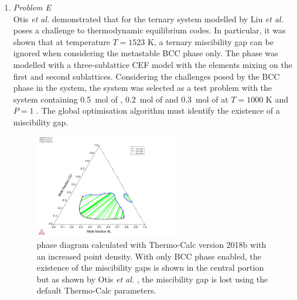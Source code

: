 \begin{enumerate}
	\item	\emph{Problem E}\\
		Otis \textit{et al.} \cite{Otis:2017ab} demonstrated that for the  ternary system modelled by Liu \textit{et al.} \cite{Liu:2015aa} poses a challenge to thermodynamic equilibrium codes. In particular, it was shown that at temperature $T = 1523$  \si{\kelvin}, a ternary miscibility gap can be ignored when considering the metastable BCC phase only. The phase was modelled with a three-sublattice CEF model with the elements mixing on the first and second sublattices. Considering the challenges posed by the BCC phase in the system, the system was selected as a test problem with the system containing \SI{0.5}{\mole} of , \SI{0.2}{\mole} of  and \SI{0.3}{\mole} of  at $T = 1000$ \si{\kelvin} and $P=1$ \si{\atmosphere}. The global optimisation algorithm must identify the existence of a miscibility gap.
		\begin{figure}[htbp]
			\centering
			\includegraphics[width=0.6\textwidth]{figures/chapter-6/System_AlCoCr.pdf}
			\caption[Global optimisation test problem E: BCC phase  ternary system with the miscibility gap.]{ phase diagram calculated with Thermo-Calc version 2018b with an increased point density. With only BCC phase enabled, the existence of the miscibility gaps is shown in the central portion but as shown by Otis \textit{et al.} \cite{Otis:2017ab}, the miscibility gap is lost using the default Thermo-Calc parameters.}
			\label{fig:testE}
		\end{figure} 
	

\end{enumerate}
